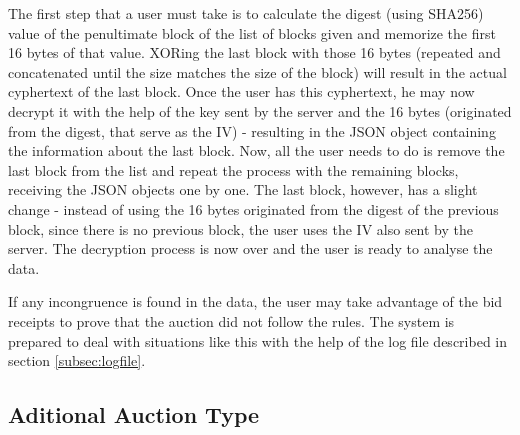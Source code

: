 \documentclass[a4paper]{article}
\begin{document}
The first step that a user must take is to calculate the digest (using SHA256) value of the penultimate block of the list of blocks given and memorize the first 16 bytes of that value.
XORing the last block with those 16 bytes (repeated and concatenated until the size matches the size of the block) will result in the actual cyphertext of the last block.
Once the user has this cyphertext, he may now decrypt it with the help of the key sent by the server and the 16 bytes (originated from the digest, that serve as the IV) - resulting in the JSON object containing the information about the last block.
Now, all the user needs to do is remove the last block from the list and repeat the process with the remaining blocks, receiving the JSON objects one by one.
The last block, however, has a slight change - instead of using the 16 bytes originated from the digest of the previous block, since there is no previous block, the user uses the IV also sent by the server.
The decryption process is now over and the user is ready to analyse the data.

If any incongruence is found in the data, the user may take advantage of the bid receipts to prove that the auction did not follow the rules.
The system is prepared to deal with situations like this with the help of the log file described in section \ref{subsec:logfile}.

\subsection{Aditional Auction Type}
\label{subsec:aditionalauctiontype}
\end{document}
